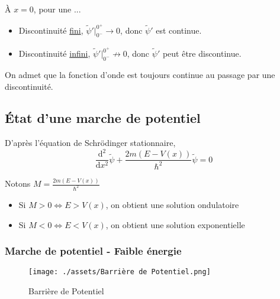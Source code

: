 À $x = 0$, pour une ... 
\begin{itemize}

  \item Discontinuité \underline{fini}, $\widetilde{\psi}' | _{0 ^{-}} ^{0 ^{+}}  \underset{}{\longrightarrow} 0$, donc $\widetilde\psi'$ est continue.  
  \item Discontinuité \underline{infini}, $\widetilde{\psi}' | _{0 ^{-}} ^{0 ^{+}}  \underset{}{\not\longrightarrow} 0$, donc $\widetilde\psi'$ peut être discontinue. 


\end{itemize}

On admet que la fonction d'onde est toujours continue au passage par une discontinuité.

\subsection{État d'une marche de potentiel} %
\label{sub:État d'une marche de potentiel}

D'après l'équation de Schrödinger stationnaire, 
\begin{equation}
  \frac{\mathrm{d} ^{2}}{\mathrm{d} x ^{2}}   \widetilde{ \psi}+ \frac{2m (E - V(x))}{\hbar ^{2}} 
 \widetilde \psi = 0
\end{equation}

Notons $M = \frac{2m(E-V(x))}{\hbar ^{2}} $

\begin{itemize}

    \item Si $M >0 \iff E > V(x)$, on obtient une solution ondulatoire 
    \item Si $M <0 \iff E < V(x)$, on obtient une solution exponentielle

\end{itemize}

\subsubsection{Marche de potentiel - Faible énergie} %


\begin{figure}[H] %
  \centering
  \texttt{[image: ./assets/Barrière de Potentiel.png]}
  \caption{Barrière de Potentiel}
  \label{fig:Barrière de Potentiel}
\end{figure}


